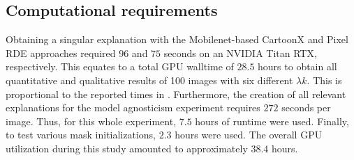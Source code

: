 \subsection{Computational requirements}



Obtaining a singular explanation with the Mobilenet-based CartoonX and Pixel RDE approaches required $96$ and $75$ seconds on an NVIDIA Titan RTX, respectively. 
This equates to a total GPU walltime of $28.5$ hours to obtain all quantitative and qualitative results of 100 images with six different $\lambda k$. %
This is proportional to the reported times in \cite{cartoonX}.
Furthermore, the creation of all relevant explanations for the model agnosticism experiment requires $272$ seconds per image. Thus, for this whole experiment, $7.5$ hours of runtime were used. Finally, to test various mask initializations, $2.3$ hours were used. The overall GPU utilization during this study amounted to approximately $38.4$ hours. 


